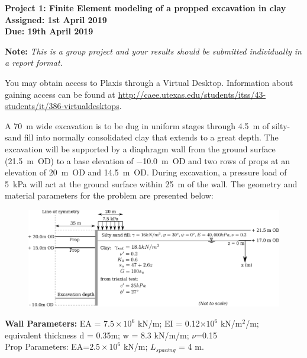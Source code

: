 \documentclass[a4paper,12pt]{article}
\begin{document}
\begin{centering}
	\textbf{
		Project 1: Finite Element modeling of a propped excavation in clay\\
		Assigned: 1st April 2019\\
		Due: 19th April 2019\\
	}
\end{centering}

\vspace{1em}

\textbf{Note: }\textit{This is a group project and your results should be submitted 
	individually in a report format.}

You may obtain access to Plaxis through a Virtual Desktop.  Information about gaining access can be found at \url{ http://caee.utexas.edu/students/itss/43-students/it/386-virtualdesktops}.  

A \SI{70}{\meter} wide excavation is to be dug in uniform stages through 
\SI{4.5}{\meter} of silty-sand fill into normally consolidated clay that 
extends to a great depth. The excavation will be supported by a diaphragm wall 
from the ground surface (\SI{+21.5}{\meter}~OD) to a base elevation of 
\SI{-10.0}{\meter}~OD and two rows of props at an elevation of 
\SI{+20}{\meter}~OD and \SI{+14.5}{\meter}~OD.  During excavation, a pressure 
load of \SI{5}{\kilo\pascal} will act at the ground surface within 
\SI{25}{\meter} of the wall.  The geometry and material parameters for the 
problem are presented below:

\begin{figure}[h]
	\includegraphics[width=\textwidth]{Problem.pdf}
\end{figure}

\begin{center}
	\textbf{Wall Parameters:} EA = $7.5\times 10^6$ kN/m; EI = 0.12$\times10^6$ 
	kN/m$^2$/m; \\ equivalent thickness d = 0.35m; w = 8.3 kN/m/m; $\nu$=0.15 \\
	Prop Parameters: EA=$2.5\times10^6$ kN/m; $L_{spacing}$ = 4 m.
\end{center}
\end{document}
